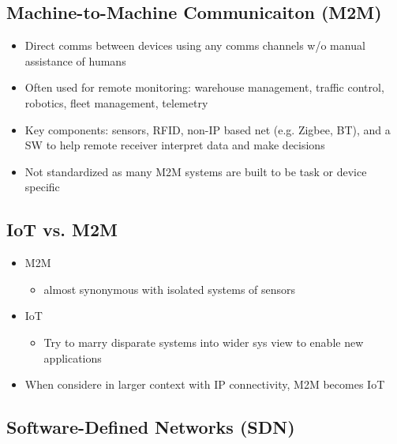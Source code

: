 \subsection{Machine-to-Machine Communicaiton (M2M)}

\begin{itemize}
	\item Direct comms between devices using any comms channels w/o manual
		assistance of humans
	\item Often used for remote monitoring: warehouse management, traffic
		control, robotics, fleet management, telemetry
	\item Key components: sensors, RFID, non-IP based net (e.g. Zigbee, BT),
		and a SW to help remote receiver interpret data and make
		decisions
	\item Not standardized as many M2M systems are built to be task or
		device specific
\end{itemize}

\subsection{IoT vs. M2M}

\begin{itemize}
	\item M2M
	\begin{itemize}
		\item almost synonymous with isolated systems of sensors
	\end{itemize}
	\item IoT
	\begin{itemize}
		\item Try to marry disparate systems into wider sys view to
			enable new applications
	\end{itemize}
	\item When considere in larger context with IP connectivity, M2M becomes
		IoT
\end{itemize}

\subsection{Software-Defined Networks (SDN)}


